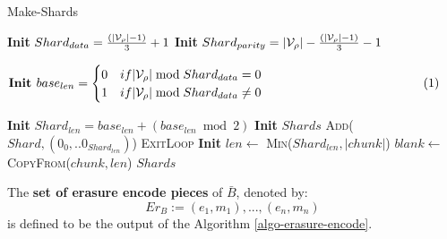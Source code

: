 \begin{algorithm}[H]
  \caption[]{\sc Make-Shards}
  \label{algo-make-shards}
  \begin{algorithmic}[1]
    \State \textbf{Init} $Shard_{data} = \frac{(|\mathcal{V}_\rho| - 1)}{3} + 1$
    \State \textbf{Init} $Shard_{parity} = |\mathcal{V}_\rho| - \frac{(|\mathcal{V}_\rho| - 1)}{3} - 1$
    \State $\vcenter{
      \begin{flalign*}
        &\textbf{Init } base_{len} =
        \begin{cases}
          0 & if |\paraValidSet| \bmod{Shard_{data}} = 0 \\
          1 & if |\paraValidSet| \bmod{Shard_{data}} \neq 0
        \end{cases}&
      \end{flalign*}
    }$
    \State \textbf{Init} $Shard_{len} = base_{len} + (base_{len} \bmod{2})$
    \Statex
    \State \textbf{Init} $Shards$
      \State \textsc{Add}($Shard, (0_0, ..0_{Shard_{len}})$)
    \EndFor
    \Statex
        \State \textsc{ExitLoop}
      \EndIf
      \Statex
      \State \textbf{Init} $len \leftarrow$ \textsc{Min}($Shard_{len}, |chunk|$)
      \State $blank \leftarrow$ \textsc{CopyFrom}($chunk, len$)
    \EndFor
    \Statex
    \State \Return $Shards$
  \end{algorithmic}
\end{algorithm}

\begin{definition}
  \label{defn-erasure-coded-pieces}
  The {\bf set of erasure encode pieces} of $\bar{B}$, denoted by:
  \[
   Er_B := {(e_1, m_1),...,(e_n,m_n)}
   \]
   is defined to be the output of the Algorithm \ref{algo-erasure-encode}.
\end{definition}

